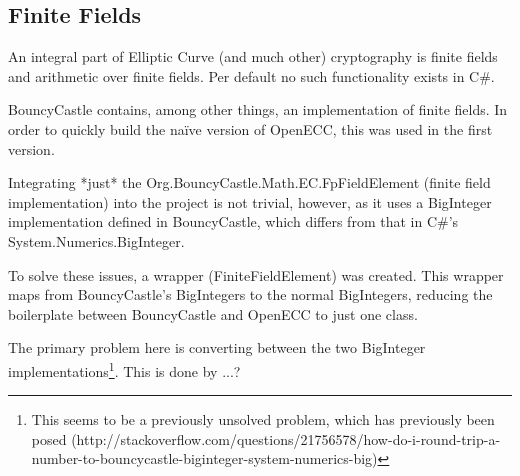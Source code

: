 \subsection{Finite Fields}

An integral part of Elliptic Curve (and much other) cryptography is finite fields and arithmetic
over finite fields. Per default no such functionality exists in C\#.

BouncyCastle contains, among other things, an implementation of finite fields. In order to quickly
build the naïve version of OpenECC, this was used in the first version.

Integrating *just* the Org.BouncyCastle.Math.EC.FpFieldElement (finite field implementation) into
the project is not trivial, however, as it uses a BigInteger implementation defined in BouncyCastle,
which differs from that in C\#'s System.Numerics.BigInteger.

To solve these issues, a wrapper (FiniteFieldElement) was created. This wrapper maps from BouncyCastle's
BigIntegers to the normal BigIntegers, reducing the boilerplate between BouncyCastle and OpenECC to
just one class.

The primary problem here is converting between the two BigInteger implementations\footnote{This seems
to be a previously unsolved problem, which has previously been posed (http://stackoverflow.com/questions/21756578/how-do-i-round-trip-a-number-to-bouncycastle-biginteger-system-numerics-big)}.
This is done by ...?